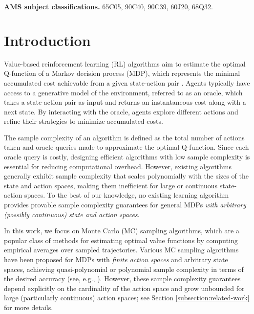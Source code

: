 \documentclass[11pt]{article}
\numberwithin{equation}{section}
\theoremstyle{definition}
\theoremstyle{remark}
\def\ms{\medskip} \def\bs{\bigskip} \def\ss{\smallskip}
\def\bs{\boldsymbol}
\newcommand{\citep}{\cite}
\newcommand{\citet}{\cite}
\begin{document}
%

\ms
\noindent
\textbf{AMS subject classifications.} 
65C05, 90C40, 90C39, 60J20, 68Q32.


%
\medskip



\section{Introduction}

Value-based reinforcement learning (RL) algorithms aim to estimate the optimal Q-function of a Markov decision process (MDP), which represents the minimal accumulated cost achievable from a given state-action pair \citep{Sutton1998}. 
Agents typically have access to a generative model of the environment, referred to as  an oracle, which takes a state-action pair as input and returns an instantaneous cost along with a next state. By interacting with the oracle, agents explore different actions and refine their strategies to minimize accumulated costs.
 

The sample complexity of an algorithm is defined as the total number of actions taken and oracle queries made to approximate the optimal Q-function. Since each oracle query is costly, designing efficient algorithms with low sample complexity is essential for reducing computational overhead. However, existing algorithms generally exhibit sample complexity that scales polynomially with the sizes of the state and action spaces, making them inefficient for large or continuous state-action spaces. 
To the best of our knowledge, no existing learning algorithm provides provable sample complexity guarantees for general MDPs \emph{with arbitrary (possibly continuous) state and action spaces}.


 

 
In this work, we focus on Monte Carlo (MC) sampling algorithms, which are a popular class of methods for estimating optimal value functions by computing empirical averages over sampled trajectories. 
Various MC sampling algorithms have been proposed for MDPs with \emph{finite action spaces} and arbitrary state spaces,
achieving quasi-polynomial or polynomial sample complexity in terms of the desired accuracy
(see, e.g., 
\citet{kearns2002sparse,grill2019planning, beck2023nonlinearmontecarlomethods}). However, these sample complexity guarantees  depend explicitly on the cardinality of the action space and  grow unbounded for large (particularly continuous) action spaces; see Section \ref{subsection:related-work} for more details.  
 
\end{document}
